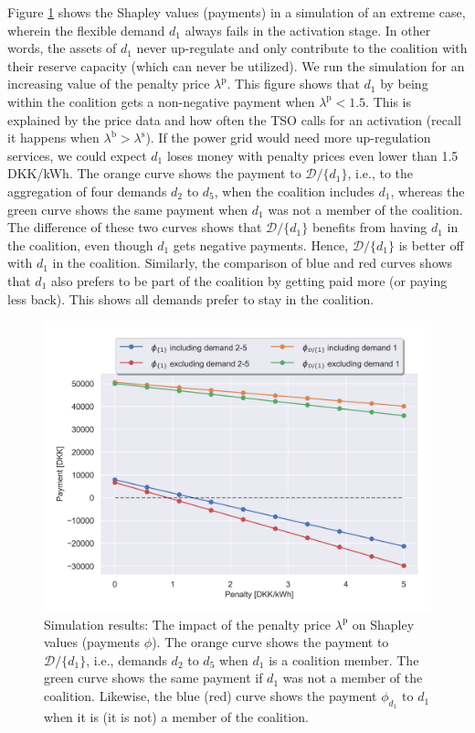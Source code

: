 \documentclass[conference]{IEEEtran}
\begin{document}
Figure \ref{fig:shapley_values} shows the Shapley values (payments) in a simulation of an extreme case, wherein the flexible demand $d_1$ always fails in the activation stage. In other words, the assets of $d_1$ never up-regulate and only contribute to the coalition with their reserve capacity (which can never be utilized). We run the simulation for an increasing value of the penalty price $\lambda^{\text{p}}$.
This figure shows that $d_1$ by being within the coalition gets a non-negative payment when $\lambda^{\text{p}} < 1.5$. This is explained by the price data and how often the TSO calls for an activation (recall it happens when $\lambda^{\text{b}} > \lambda^{\text{s}}$). If the power grid would need more up-regulation services, we could expect $d_1$ loses money with penalty prices even lower than 1.5 DKK/kWh. The orange curve shows the payment to $\mathcal{D} / \{d_1\}$, i.e., to the aggregation of four demands $d_2$ to $d_5$, when the coalition includes $d_1$, whereas the green curve shows the same payment when $d_1$ was not a member of the coalition. The difference of these two curves shows that $\mathcal{D} / \{d_1\}$ benefits from having $d_1$ in the coalition, even though $d_1$ gets negative payments. Hence, $\mathcal{D} / \{d_1\}$ is better off with $d_1$ in the coalition. 
Similarly, the comparison of blue and red curves shows that $d_1$ also prefers to be part of the coalition by getting paid more (or paying less back). This shows all demands prefer to stay in the coalition. 



\begin{figure}[!t]
    \centering
    \includegraphics[width=\columnwidth]{figures/shapley_values.png}
    \caption{Simulation results: The impact of the penalty price $\lambda^{\text{p}}$ on
    Shapley values (payments $\phi$). The orange curve shows the payment  to $\mathcal{D} / \{d_1\}$, i.e., demands $d_2$ to $d_5$ when $d_1$ is a coalition member. The green curve shows the same payment if $d_1$ was not a member of the coalition. Likewise, the blue (red) curve shows the payment $\phi_{d_1}$ to $d_1$ when it is (it is not) a member of the coalition.}
    \label{fig:shapley_values}
\end{figure}
\end{document}
